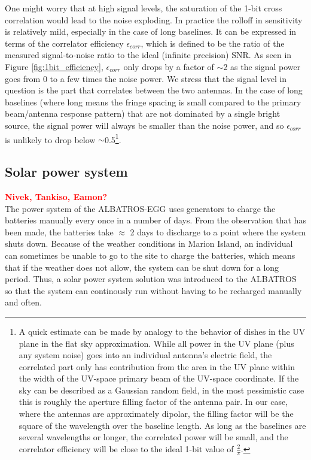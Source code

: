 \documentclass{ws-jai}
\newcommand{\attention}[1]{\textcolor{red}{\bf {#1}}}
\begin{document}
One might worry that at high signal levels, the saturation of the 1-bit cross correlation would lead to the noise exploding.  In practice the rolloff in sensitivity is relatively mild, especially in the case of long baselines.  It can be expressed in terms of the correlator efficiency $\epsilon_{corr}$, which is defined to be the ratio of the measured signal-to-noise ratio to the ideal (infinite precision) SNR.  As seen in Figure \ref{fig:1bit_efficiency}, $\epsilon_{corr}$ only drops by a factor of $\sim$2 as the signal power goes from 0 to a few times the noise power.  We stress that the signal level in question is the part that correlates between the two antennas.  In the case of long baselines (where long means the fringe spacing is small compared to the primary beam/antenna response pattern) that are not dominated by a single bright source, the signal power will always be smaller than the noise power, and so $\epsilon_{corr}$ is unlikely to drop below $\sim$0.5\footnote{A quick estimate can be made by analogy to the behavior of dishes in the UV plane in the flat sky approximation.  While all power in the UV plane (plus any system noise) goes into an individual antenna's electric field, the correlated part only has contribution from the area in the UV plane within the width of the UV-space primary beam of the UV-space coordinate.  If the sky can be described as a Gaussian random field, in the most pessimistic case this is roughly the aperture filling factor of the antenna pair.  In our case, where the antennas are approximately dipolar, the filling factor will be the square of the wavelength over the baseline length.  As long as the baselines are several wavelengths or longer, the correlated power will be small, and the correlator efficiency will be close to the ideal 1-bit value of $\frac{2}{\pi}$.}.


\subsection{Solar power system}
\attention{Nivek, Tankiso, Eamon?} \\
The power system of the ALBATROS-EGG uses generators to charge the batteries manually every once in a number of days. From the observation that has been made, the batteries take $\approx$ 2 days to discharge to a point where the system shuts down. Because of the weather conditions in Marion Island, an individual can sometimes be unable to go to the site to charge the batteries, which means that if the weather does not allow, the system can be shut down for a long period. Thus, a solar power system solution was introduced to the ALBATROS so that the system can continously run without having to be recharged manually and often.\\
\end{document}
